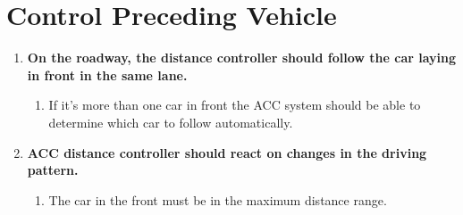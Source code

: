 \section{Control Preceding Vehicle}

	\begin{enumerate}
		\item {\bf On the roadway, the distance controller should follow the car laying in 
		front in the same lane.}
			\begin{enumerate}[label*=\arabic*.]
				\item If it’s more than one car in front the ACC system should be able 
				to determine which car to follow automatically.
			\end{enumerate}
		\item {\bf ACC distance controller should react on changes in the driving pattern.}
			\begin{enumerate}[label*=\arabic*.]
				\item The car in the front must be in the maximum distance range. 
			\end{enumerate}
	\end{enumerate}	

	\clearpage


